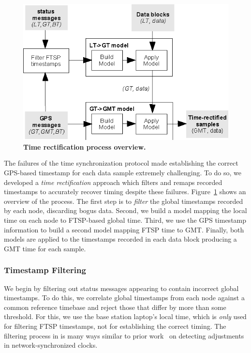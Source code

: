 \begin{figure}[t]
\begin{center}
\includegraphics[width=0.8\hsize]{./figs/OSDI2006/2006-RectificationCartoon.eps}
\end{center}
\caption{{\bf Time rectification process overview.}}
\label{fig-rectificationcartoon}
\end{figure}

The failures of the time synchronization protocol made establishing the
correct GPS-based timestamp for each data sample extremely challenging.  To
do so, we developed a {\em time rectification} approach which filters and
remaps recorded timestamps to accurately recover timing despite these
failures. Figure~\ref{fig-rectificationcartoon} shows an overview of the
process.  The first step is to {\em filter} the global timestamps recorded
by each node, discarding bogus data. Second, we build a model mapping the
local time on each node to FTSP-based global time.  Third, we use the GPS
timestamp information to build a second model mapping FTSP time to GMT.
Finally, both models are applied to the timestamps recorded in each data
block producing a GMT time for each sample.

\subsubsection{Timestamp Filtering}
\label{subsection-filtering}

We begin by filtering out status messages appearing to contain incorrect
global timestamps. To do this, we correlate global timestamps from each node
against a common reference timebase and reject those that differ by more than
some threshold.  For this, we use the base station laptop's local time, which
is {\em only} used for filtering FTSP timestamps, not for establishing the
correct timing. The filtering process in is many ways similar to prior
work~\cite{paxson98calibrating,1028824} on detecting adjustments in
network-synchronized clocks.


